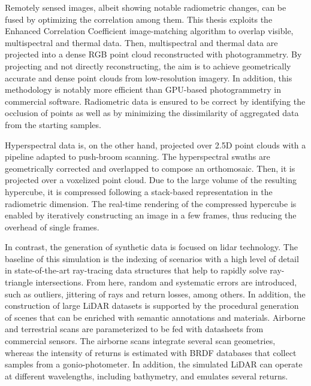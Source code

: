 Remotely sensed images, albeit showing notable radiometric changes, can be fused by optimizing the correlation among them. This thesis exploits the Enhanced Correlation Coefficient image-matching algorithm to overlap visible, multispectral and thermal data. Then, multispectral and thermal data are projected into a dense RGB point cloud reconstructed with photogrammetry. By projecting and not directly reconstructing, the aim is to achieve geometrically accurate and dense point clouds from low-resolution imagery. In addition, this methodology is notably more efficient than GPU-based photogrammetry in commercial software. Radiometric data is ensured to be correct by identifying the occlusion of points as well as by minimizing the dissimilarity of aggregated data from the starting samples. 


Hyperspectral data is, on the other hand, projected over 2.5D point clouds with a pipeline adapted to push-broom scanning. The hyperspectral swaths are geometrically corrected and overlapped to compose an orthomosaic. Then, it is projected over a voxelized point cloud. Due to the large volume of the resulting hypercube, it is compressed following a stack-based representation in the radiometric dimension. The real-time rendering of the compressed hypercube is enabled by iteratively constructing an image in a few frames, thus reducing the overhead of single frames. 

In contrast, the generation of synthetic data is focused on \acrshort{lidar} technology. The baseline of this simulation is the indexing of scenarios with a high level of detail in state-of-the-art ray-tracing data structures that help to rapidly solve ray-triangle intersections. From here, random and systematic errors are introduced, such as outliers, jittering of rays and return losses, among others. In addition, the construction of large LiDAR datasets is supported by the procedural generation of scenes that can be enriched with semantic annotations and materials. Airborne and terrestrial scans are parameterized to be fed with datasheets from commercial sensors. The airborne scans integrate several scan geometries, whereas the intensity of returns is estimated with BRDF databases that collect samples from a gonio-photometer. In addition, the simulated LiDAR can operate at different wavelengths, including bathymetry, and emulates several returns.

